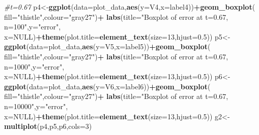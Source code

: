 \documentclass[
]{article}
\newenvironment{Shaded}{\begin{snugshade}}{\end{snugshade}}
\newcommand{\CommentTok}[1]{\textcolor[rgb]{0.56,0.35,0.01}{\textit{#1}}}
\newcommand{\DataTypeTok}[1]{\textcolor[rgb]{0.13,0.29,0.53}{#1}}
\newcommand{\DecValTok}[1]{\textcolor[rgb]{0.00,0.00,0.81}{#1}}
\newcommand{\FloatTok}[1]{\textcolor[rgb]{0.00,0.00,0.81}{#1}}
\newcommand{\KeywordTok}[1]{\textcolor[rgb]{0.13,0.29,0.53}{\textbf{#1}}}
\newcommand{\NormalTok}[1]{#1}
\newcommand{\OperatorTok}[1]{\textcolor[rgb]{0.81,0.36,0.00}{\textbf{#1}}}
\newcommand{\OtherTok}[1]{\textcolor[rgb]{0.56,0.35,0.01}{#1}}
\newcommand{\StringTok}[1]{\textcolor[rgb]{0.31,0.60,0.02}{#1}}
\begin{document}
\begin{Shaded}
\begin{Highlighting}[]
\CommentTok{#t=0.67}
\NormalTok{p4<-}\KeywordTok{ggplot}\NormalTok{(}\DataTypeTok{data=}\NormalTok{plot_data,}\KeywordTok{aes}\NormalTok{(}\DataTypeTok{y=}\NormalTok{V4,}\DataTypeTok{x=}\NormalTok{label4))}\OperatorTok{+}\KeywordTok{geom_boxplot}\NormalTok{(}
  \DataTypeTok{fill=}\StringTok{"thistle"}\NormalTok{,}\DataTypeTok{colour=}\StringTok{"gray27"}\NormalTok{)}\OperatorTok{+}
\StringTok{  }\KeywordTok{labs}\NormalTok{(}\DataTypeTok{title=}\StringTok{"Boxplot of error at t=0.67, n=100"}\NormalTok{,}\DataTypeTok{y=}\StringTok{"error"}\NormalTok{,}
       \DataTypeTok{x=}\OtherTok{NULL}\NormalTok{)}\OperatorTok{+}\KeywordTok{theme}\NormalTok{(}\DataTypeTok{plot.title=}\KeywordTok{element_text}\NormalTok{(}\DataTypeTok{size=}\DecValTok{13}\NormalTok{,}\DataTypeTok{hjust=}\FloatTok{0.5}\NormalTok{))}
\NormalTok{p5<-}\KeywordTok{ggplot}\NormalTok{(}\DataTypeTok{data=}\NormalTok{plot_data,}\KeywordTok{aes}\NormalTok{(}\DataTypeTok{y=}\NormalTok{V5,}\DataTypeTok{x=}\NormalTok{label5))}\OperatorTok{+}\KeywordTok{geom_boxplot}\NormalTok{(}
  \DataTypeTok{fill=}\StringTok{"thistle"}\NormalTok{,}\DataTypeTok{colour=}\StringTok{"gray27"}\NormalTok{)}\OperatorTok{+}
\StringTok{  }\KeywordTok{labs}\NormalTok{(}\DataTypeTok{title=}\StringTok{"Boxplot of error at t=0.67, n=1000"}\NormalTok{,}\DataTypeTok{y=}\StringTok{"error"}\NormalTok{,}
       \DataTypeTok{x=}\OtherTok{NULL}\NormalTok{)}\OperatorTok{+}\KeywordTok{theme}\NormalTok{(}\DataTypeTok{plot.title=}\KeywordTok{element_text}\NormalTok{(}\DataTypeTok{size=}\DecValTok{13}\NormalTok{,}\DataTypeTok{hjust=}\FloatTok{0.5}\NormalTok{))}
\NormalTok{p6<-}\KeywordTok{ggplot}\NormalTok{(}\DataTypeTok{data=}\NormalTok{plot_data,}\KeywordTok{aes}\NormalTok{(}\DataTypeTok{y=}\NormalTok{V6,}\DataTypeTok{x=}\NormalTok{label6))}\OperatorTok{+}\KeywordTok{geom_boxplot}\NormalTok{(}
  \DataTypeTok{fill=}\StringTok{"thistle"}\NormalTok{,}\DataTypeTok{colour=}\StringTok{"gray27"}\NormalTok{)}\OperatorTok{+}
\StringTok{  }\KeywordTok{labs}\NormalTok{(}\DataTypeTok{title=}\StringTok{"Boxplot of error at t=0.67, n=10000"}\NormalTok{,}\DataTypeTok{y=}\StringTok{"error"}\NormalTok{,}
       \DataTypeTok{x=}\OtherTok{NULL}\NormalTok{)}\OperatorTok{+}\KeywordTok{theme}\NormalTok{(}\DataTypeTok{plot.title=}\KeywordTok{element_text}\NormalTok{(}\DataTypeTok{size=}\DecValTok{13}\NormalTok{,}\DataTypeTok{hjust=}\FloatTok{0.5}\NormalTok{))}
\NormalTok{g2<-}\KeywordTok{multiplot}\NormalTok{(p4,p5,p6,}\DataTypeTok{cols=}\DecValTok{3}\NormalTok{)}


\end{Highlighting}
\end{Shaded}
\end{document}
